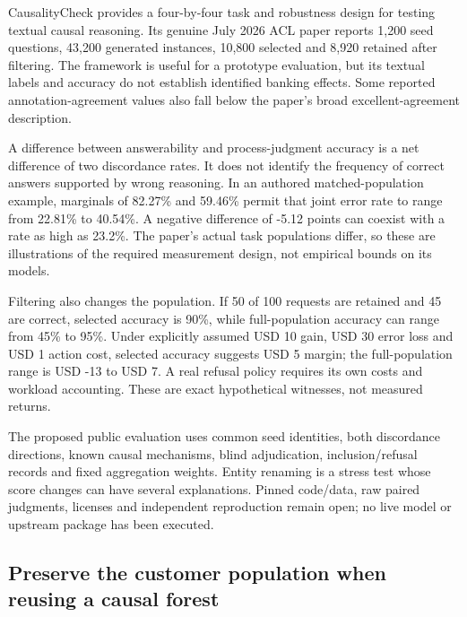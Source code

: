 CausalityCheck provides a four-by-four task and robustness design for
testing textual causal reasoning. Its genuine July 2026 ACL paper
reports 1,200 seed questions, 43,200 generated instances, 10,800
selected and 8,920 retained after filtering. The framework is useful for
a prototype evaluation, but its textual labels and accuracy do not
establish identified banking effects. Some reported annotation-agreement
values also fall below the paper's broad excellent-agreement
description. \citep{exec21_causalitycheck}

A difference between answerability and process-judgment accuracy is a
net difference of two discordance rates. It does not identify the
frequency of correct answers supported by wrong reasoning. In an
authored matched-population example, marginals of 82.27\% and 59.46\%
permit that joint error rate to range from 22.81\% to 40.54\%. A
negative difference of -5.12 points can coexist with a rate as high as
23.2\%. The paper's actual task populations differ, so these are
illustrations of the required measurement design, not empirical bounds
on its models. \citep{exec21_causalitycheck_reference}

Filtering also changes the population. If 50 of 100 requests are
retained and 45 are correct, selected accuracy is 90\%, while
full-population accuracy can range from 45\% to 95\%. Under explicitly
assumed USD 10 gain, USD 30 error loss and USD 1 action cost, selected
accuracy suggests USD 5 margin; the full-population range is USD -13 to
USD 7. A real refusal policy requires its own costs and workload
accounting. These are exact hypothetical witnesses, not measured
returns. \citep{exec21_causalitycheck_reference}

The proposed public evaluation uses common seed identities, both
discordance directions, known causal mechanisms, blind adjudication,
inclusion/refusal records and fixed aggregation weights. Entity renaming
is a stress test whose score changes can have several explanations.
Pinned code/data, raw paired judgments, licenses and independent
reproduction remain open; no live model or upstream package has been
executed. \citep{exec21_causalitycheck}

\hypertarget{preserve-the-customer-population-when-reusing-a-causal-forest}{%
\subsection{Preserve the customer population when reusing a causal
forest}\label{preserve-the-customer-population-when-reusing-a-causal-forest}}

